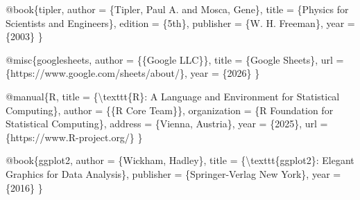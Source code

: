 @book\{tipler, author = \{Tipler, Paul A. and Mosca, Gene\}, title =
\{Physics for Scientists and Engineers\}, edition = \{5th\}, publisher =
\{W. H. Freeman\}, year = \{2003\} \}

@misc\{googlesheets, author = \{\{Google LLC\}\}, title = \{Google
Sheets\}, url = \{https://www.google.com/sheets/about/\}, year =
\{2026\} \}

@manual\{R, title = \{\textbackslash texttt\{R\}: A Language and
Environment for Statistical Computing\}, author = \{\{R Core Team\}\},
organization = \{R Foundation for Statistical Computing\}, address =
\{Vienna, Austria\}, year = \{2025\}, url =
\{https://www.R-project.org/\} \}

@book\{ggplot2, author = \{Wickham, Hadley\}, title =
\{\textbackslash texttt\{ggplot2\}: Elegant Graphics for Data
Analysis\}, publisher = \{Springer-Verlag New York\}, year = \{2016\} \}
